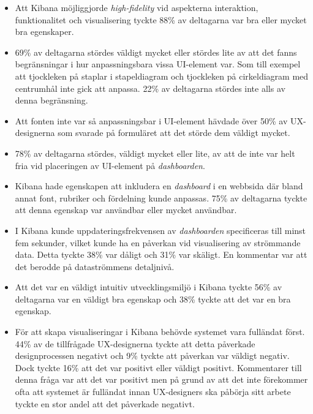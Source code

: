 \documentclass[12pt]{kththesis}
\begin{document}
\begin{itemize}
\item Att Kibana möjliggjorde \textit{high-fidelity} vid aspekterna interaktion, funktionalitet och visualisering tyckte 88\% av deltagarna var bra eller mycket bra egenskaper.

\item 69\% av deltagarna stördes väldigt mycket eller stördes lite av att det fanns begränsningar i hur anpassningsbara vissa UI-element var. Som till exempel att tjockleken på staplar i stapeldiagram och tjockleken på cirkeldiagram med centrumhål inte gick att anpassa. 22\% av deltagarna stördes inte alls av denna begränsning.

\item Att fonten inte var så anpassningsbar i UI-element hävdade över 50\% av UX-designerna som svarade på formuläret att det störde dem väldigt mycket.

\item 78\% av deltagarna stördes, väldigt mycket eller lite, av att de inte var helt fria vid placeringen av UI-element på \textit{dashboarden}. 

\item Kibana hade egenskapen att inkludera en \textit{dashboard} i en webbsida där bland annat font, rubriker och fördelning kunde anpassas. 75\% av deltagarna tyckte att denna egenskap var användbar eller mycket användbar.

\item I Kibana kunde uppdateringsfrekvensen av \textit{dashboarden} specificeras till minst fem sekunder, vilket kunde ha en påverkan vid visualisering av strömmande data. Detta tyckte 38\% var dåligt och 31\% var skäligt. En kommentar var att det berodde på dataströmmens detaljnivå.

\item Att det var en väldigt intuitiv utvecklingsmiljö i Kibana tyckte 56\% av deltagarna var en väldigt bra egenskap och 38\% tyckte att det var en bra egenskap.

\item För att skapa visualiseringar i Kibana behövde systemet vara fulländat först. 44\% av de tillfrågade UX-designerna tyckte att detta påverkade designprocessen negativt och 9\% tyckte att påverkan var väldigt negativ. Dock tyckte 16\% att det var positivt eller väldigt positivt. Kommentarer till denna fråga var att det var positivt men på grund av att det inte förekommer ofta att systemet är fulländat innan UX-designers ska påbörja sitt arbete tyckte en stor andel att det påverkade negativt.


\end{itemize}
\end{document}
